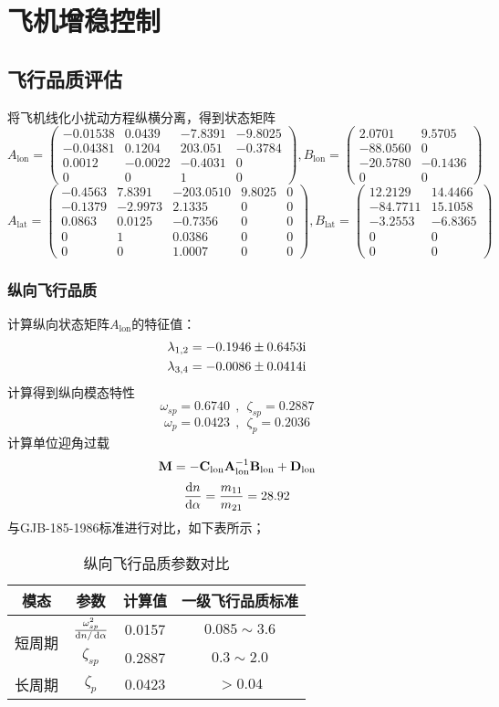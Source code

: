 \section{飞机增稳控制}
\subsection{飞行品质评估}
将飞机线化小扰动方程纵横分离，得到状态矩阵
$$
A_{\text{lon}}=
\begin{pmatrix}
-0.01538&0.0439&-7.8391&-9.8025\\
-0.04381&0.1204&203.051&-0.3784\\
0.0012&-0.0022&-0.4031&0\\
0&0&1&0
\end{pmatrix}
,
B_{\text{lon}}=
\begin{pmatrix}
2.0701&9.5705\\
-88.0560&0\\
-20.5780&-0.1436\\
0&0
\end{pmatrix}
$$
$$
A_{\text{lat}}=
\begin{pmatrix}
-0.4563&7.8391&-203.0510&9.8025&0\\
-0.1379&-2.9973&2.1335&0&0\\
0.0863&0.0125&-0.7356&0&0\\
0&1&0.0386&0&0\\
0&0&1.0007&0&0
\end{pmatrix}
,
B_{\text{lat}}=
\begin{pmatrix}
12.2129&14.4466\\
-84.7711&15.1058\\
-3.2553&-6.8365\\
0&0\\
0&0
\end{pmatrix}
$$
\subsubsection{纵向飞行品质}
计算纵向状态矩阵$A_{\text{lon}}$的特征值：
$$
\begin{aligned}
\lambda_{1,2}&=-0.1946\pm 0.6453{\mathrm i}\\
\lambda_{3,4}&=-0.0086\pm 0.0414{\mathrm i}
\end{aligned}
$$
计算得到纵向模态特性
$$
\omega_{sp}=0.6740\ \ ,\ \ \zeta_{sp}=0.2887
$$
$$
\omega_{p}=0.0423\ \ ,\ \ \zeta_{p}=0.2036
$$
计算单位迎角过载
$$
{\mathbf M}=-{\mathbf C}_{\text{lon}}{\mathbf A}_{\text{lon}}^{-1}{\mathbf B}_{\text{lon}}+{\mathbf D}_{\text{lon}}
$$
$$
\frac{\operatorname{d\!} n}{\operatorname{d\!}\alpha}=\frac{m_{11}}{m_{21}}=28.92
$$
与GJB-185-1986标准进行对比，如下表所示；
\begin{table}[!h]
\centering
\caption{纵向飞行品质参数对比}
\begin{tabular}{@{}cccc@{}}
\toprule
模态&参数 & 计算值 & 一级飞行品质标准 \\ \midrule
\multirow{2}{*}{短周期}&$\frac{\omega_{sp}^2}{\operatorname{d\!} n/\operatorname{d\!} \alpha}$ & 0.0157 & $0.085\sim3.6$ \\
&$\zeta_{sp}$ & 0.2887 & $0.3\sim2.0$ \\ \midrule
长周期&$\zeta_p$ & 0.0423 & $>0.04$ \\ \bottomrule
\end{tabular}
\end{table}

